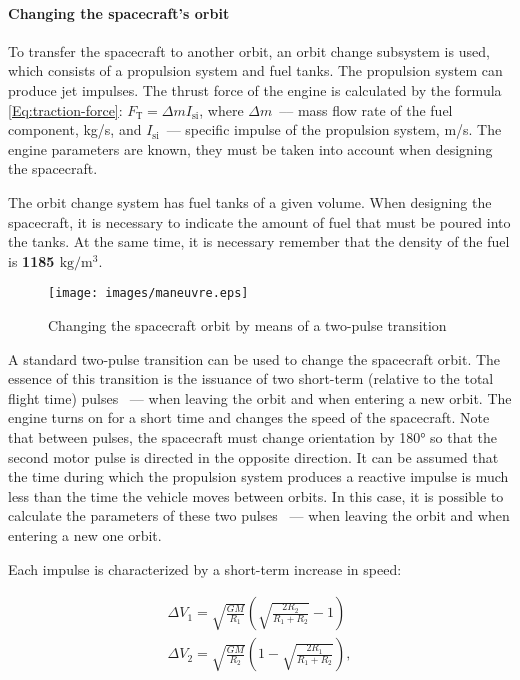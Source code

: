 \documentclass[12pt,a4paper]{article}
\begin{document}
\paragraph{Changing the spacecraft's orbit}

To transfer the spacecraft to another orbit, an orbit change subsystem is used, which consists of a propulsion system and fuel tanks. The propulsion system can produce jet impulses. The thrust force of the engine is calculated by the formula \ref{Eq:traction-force}: $
F_{\text{Т}} = \Delta m I_{\text{si}} $, where $\Delta m$~--– mass flow rate of the fuel component, kg/s, and $I_{\text{si}}$~--- specific impulse of the propulsion system, m/s. The engine parameters are known, they must be taken into account when designing the spacecraft.

The orbit change system has fuel tanks of a given volume. When designing the spacecraft, it is necessary to indicate the amount of fuel that must be poured into the tanks. At the same time, it is necessary
remember that the density of the fuel is \textbf{1185 $\text{kg}/\text{m}^3$}.

\begin{figure}[tbh]
  \begin{center}
    \texttt{[image: images/maneuvre.eps]}
    \caption{Changing the spacecraft orbit by means of a two-pulse transition}
    \label{Pic:Maneuvre}
  \end{center}
\end{figure}

A standard two-pulse transition can be used to change the spacecraft orbit. The essence of this transition is the issuance of two short-term (relative to the total flight time) pulses ~--- when leaving the orbit and when entering a new orbit. The engine turns on for a short time and changes the speed of the spacecraft. Note that between pulses, the spacecraft must change orientation by 180° so that the second motor pulse is directed in the opposite direction.
It can be assumed that the time during which the propulsion system produces a reactive impulse is much less than the time the vehicle moves between orbits. In this case, it is possible to calculate the parameters of these two pulses ~--- when leaving the orbit and when entering a new one
orbit.

Each impulse is characterized by a short-term increase in speed:

\begin{eqnarray}
  \Delta V_1 = \sqrt{\frac{G M}{R_1}}\left(\sqrt{\frac{2 R_2}{R_1 + R_2}} - 1\right)\\
  \Delta V_2 = \sqrt{\frac{G M}{R_2}}\left(1 - \sqrt{\frac{2 R_1}{R_1 + R_2}}\right),
\end{eqnarray}
\end{document}
